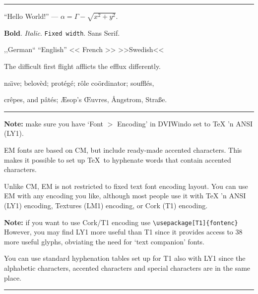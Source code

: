 \documentclass{article}
\begin{document}
\hrule \vskip 2mm

``Hello World!'' --- $\alpha = \Gamma -\sqrt{x^2+y^2}$.

\vskip 2mm

{\bf Bold}. {\it Italic}. {\tt Fixed width}. {\sf Sans Serif}.

\vskip 2mm

,,German`` ``English'' << French >>  >>Swedish<<

\vskip 2mm

The difficult first flight afflicts the efflux differently.

\vskip 2mm

na\"\i ve; belov\`ed; prot\'eg\'e; r\^ole co\"ordinator; souffl\'es, 

\vskip 2mm

cr\^epes, and p\^at\'es; \AE sop's \OE uvres, \AA ngstrom, Stra\ss e.

\vskip 2mm \hrule \vskip 2mm

\noindent
{\bf Note:} make sure you have `Font $>$ Encoding' in DVIWindo set to 
TeX 'n ANSI (LY1).

\vskip 2mm

EM fonts are based on CM, but include ready-made accented characters.
This makes it possible to set up \TeX\ to hyphenate words that contain
accented characters.

Unlike CM, EM is not restricted to fixed text font encoding layout.
You can use EM with any encoding you like, although most people
use it with TeX 'n ANSI (LY1) encoding, Textures (LM1) encoding,
or Cork (T1) encoding.

{\bf Note:} if you want to use Cork/T1 encoding use 
\verb+\usepackage[T1]{fontenc}+
%
However, you may find LY1 more useful than T1 since it provides access 
to 38 more useful glyphs, obviating the need for `text companion' fonts.

You can use standard hyphenation tables set up for T1 also with LY1
since the alphabetic characters, accented characters and special
characters are in the same place.

\vskip 2mm \hrule
\end{document}
